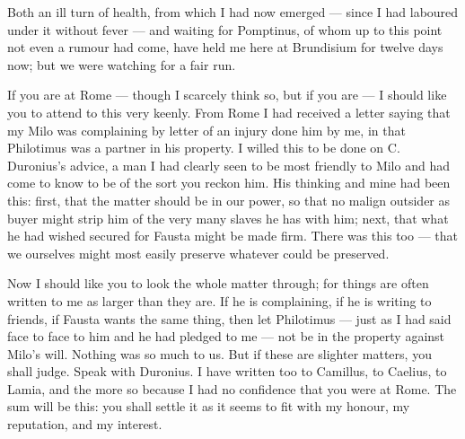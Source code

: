 

 Both an ill turn of health, from which I had now emerged --- since I had laboured under it without fever --- and waiting for Pomptinus, of whom up to this point not even a rumour had come, have held me here at Brundisium for twelve days now; but we were watching for a fair run.

 If you are at Rome --- though I scarcely think so, but if you are --- I should like you to attend to this very keenly. From Rome I had received a letter saying that my Milo was complaining by letter of an injury done him by me, in that Philotimus was a partner in his property. I willed this to be done on C. Duronius's advice, a man I had clearly seen to be most friendly to Milo and had come to know to be of the sort you reckon him. His thinking and mine had been this: first, that the matter should be in our power, so that no malign outsider as buyer might strip him of the very many slaves he has with him; next, that what he had wished secured for Fausta might be made firm. There was this too --- that we ourselves might most easily preserve whatever could be preserved.

 Now I should like you to look the whole matter through; for things are often written to me as larger than they are. If he is complaining, if he is writing to friends, if Fausta wants the same thing, then let Philotimus --- just as I had said face to face to him and he had pledged to me --- not be in the property against Milo's will. Nothing was so much to us. But if these are slighter matters, you shall judge. Speak with Duronius. I have written too to Camillus, to Caelius, to Lamia, and the more so because I had no confidence that you were at Rome. The sum will be this: you shall settle it as it seems to fit with my honour, my reputation, and my interest.
